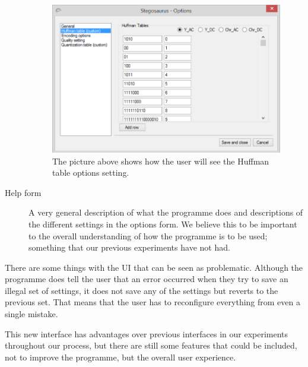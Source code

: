 \begin{description}
\begin{figure}
	\centering
	\includegraphics[width=1\textwidth]{figures/StegoOptionHuff2.png}
	\caption{The picture above shows how the user will see the Huffman table options setting.}
	\label{fig:StegoOptionHuff2}
\end{figure}

\item[Help form]
A very general description of what the programme does and descriptions of the different settings in the options form.
We believe this to be important to the overall understanding of how the programme is to be used; something that our previous experiments have not had.
\end{description}

There are some things with the UI that can be seen as problematic.
Although the programme does tell the user that an error occurred when they try to save an illegal set of settings, it does not save any of the settings but reverts to the previous set. That means that the user has to reconfigure everything from even a single mistake.

This new interface has advantages over previous interfaces in our experiments throughout our process, but there are still some features that could be included, not to improve the programme, but the overall user experience.